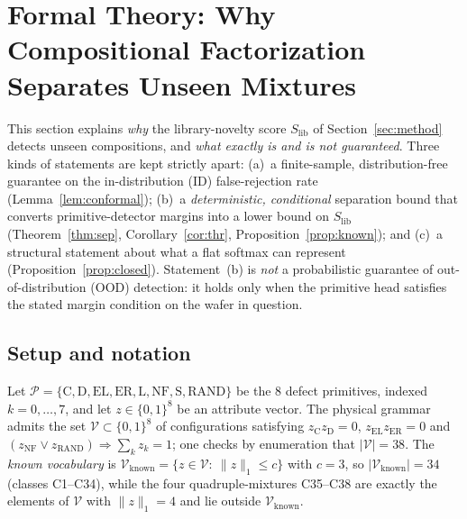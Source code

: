 \newtheorem{theorem}{Theorem}
\newtheorem{proposition}[theorem]{Proposition}
\newtheorem{lemma}{Lemma}
\theoremstyle{definition}
\newtheorem{definition}{Definition}
\newtheorem{corollary}{Corollary}
\theoremstyle{remark}
\newtheorem{remark}{Remark}
\newcommand{\Vk}{\mathcal{V}_{\mathrm{known}}}
\newcommand{\Slib}{S_{\mathrm{lib}}}
\newcommand{\qlib}{\hat q_{\mathrm{lib}}}
\newcommand{\softplus}{\operatorname{softplus}}
\newcommand{\Prb}{\mathbb{P}}
\providecommand{\sigmoid}{\sigma}

\section{Formal Theory: Why Compositional Factorization Separates Unseen Mixtures}
\label{sec:theory}

This section explains \emph{why} the library-novelty score $\Slib$ of
Section~\ref{sec:method} detects unseen compositions, and \emph{what exactly is and is not
guaranteed}. Three kinds of statements are kept strictly apart:
(a)~a finite-sample, distribution-free guarantee on the in-distribution (ID) false-rejection
rate (Lemma~\ref{lem:conformal}); (b)~a \emph{deterministic, conditional} separation bound that
converts primitive-detector margins into a lower bound on $\Slib$ (Theorem~\ref{thm:sep},
Corollary~\ref{cor:thr}, Proposition~\ref{prop:known}); and (c)~a structural statement about
what a flat softmax can represent (Proposition~\ref{prop:closed}). Statement~(b) is \emph{not} a
probabilistic guarantee of out-of-distribution (OOD) detection: it holds only when the
primitive head satisfies the stated margin condition on the wafer in question.

\subsection{Setup and notation}
Let $\mathcal{P}=\{\mathrm{C},\mathrm{D},\mathrm{EL},\mathrm{ER},\mathrm{L},\mathrm{NF},\mathrm{S},\mathrm{RAND}\}$
be the $8$ defect primitives, indexed $k=0,\dots,7$, and let $z\in\{0,1\}^8$ be an attribute
vector. The physical grammar admits the set $\mathcal{V}\subset\{0,1\}^8$ of configurations
satisfying $z_{\mathrm{C}}z_{\mathrm{D}}=0$, $z_{\mathrm{EL}}z_{\mathrm{ER}}=0$ and
$(z_{\mathrm{NF}}\lor z_{\mathrm{RAND}})\Rightarrow\sum_k z_k=1$; one checks by enumeration that
$|\mathcal{V}|=38$. The \emph{known vocabulary} is
$\Vk=\{z\in\mathcal{V}:\ \|z\|_1\le c\}$ with $c=3$, so $|\Vk|=34$ (classes C1--C34), while the
four quadruple-mixtures C35--C38 are exactly the elements of $\mathcal{V}$ with $\|z\|_1=4$ and
lie outside $\Vk$.


